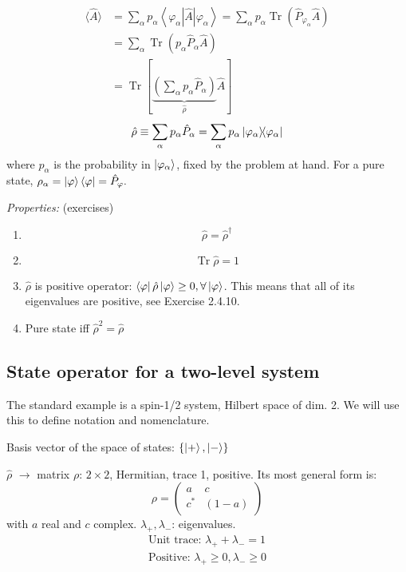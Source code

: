 \documentclass[12pt]{article}
\newcommand{\be}{\begin{equation}}
\newcommand{\ee}{\end{equation}}
\begin{document}
\[
\begin{aligned}
\langle\hat{A}\rangle 
&=\sum_{\alpha} p_{\alpha}\left\langle\varphi_{\alpha}|\hat{A}| \varphi_{\alpha}\right\rangle=\sum_{\alpha} p_{\alpha} \operatorname{Tr}\left(\hat{P}_{\varphi_{\alpha}} \hat{A}\right) \\ 
&=\sum_{\alpha} \operatorname{Tr}\left(p_{\alpha} \hat{P}_{\alpha} \hat{A}\right)\\
&=\operatorname{Tr}\left[
\underbrace{\left(\sum_{\alpha} p_{\alpha} \hat{P}_{\alpha}\right)}%
_{\hat{\rho}} 
\hat{A}\right]
\end{aligned}
\]
\be
\hat{\rho} \equiv \sum_\alpha p_\alpha \hat{P}_\alpha =
\sum_\alpha p_\alpha \op{\varphi_\alpha}{\varphi_\alpha}
\ee
where $p_\alpha$ is the probability in $\ket{\varphi_\alpha}$, fixed by the problem at hand.
For a pure state, $\rho_\alpha = \ket{\varphi}\bra{\varphi} = \hat{P}_\varphi.$

\emph{Properties:} (exercises)
\begin{enumerate}
\item \[\hat{\rho} = \hat{\rho}^\dagger\]
\item \be\operatorname{Tr}\hat{\rho} = 1\ee
\item $\hat{\rho}$ is positive operator: $\bra{\varphi}\hat{\rho}\ket{\varphi} \geq 0, \forall \ket{\varphi}$. This means that all of its eigenvalues are positive, see Exercise 2.4.10.
\item Pure state iff $\hat{\rho}^2 = \hat{\rho}$
\end{enumerate}

\subsection{State operator for a two-level system}

The standard example is a spin-1/2 system, Hilbert space of dim. 2.
We will use this to define notation and nomenclature.

Basis vector of the space of states: $\{\ket{+},\ket{-}\}$

$\hat{\rho}$ $\to$ matrix $\rho$: $2\times2$, Hermitian, trace 1, positive.
Its most general form is:
\be
\rho = 
\begin{pmatrix}
a & c\\
c^* & (1-a)
\end{pmatrix}
\label{eq:g29}
\ee
with $a$ real and $c$ complex.
$\lambda_+,\lambda_-$: eigenvalues.
\be
\begin{gathered}
\text{Unit trace: }\lambda_+ + \lambda_- = 1\\
\text{Positive: }\lambda_+ \geq 0, \lambda_- \geq 0
\end{gathered}
\ee
\end{document}

